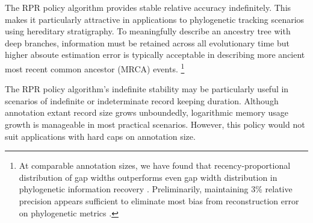 The RPR policy algorithm provides stable relative accuracy indefinitely.
This makes it particularly attractive in applications to phylogenetic tracking scenarios using hereditary stratigraphy.
To meaningfully describe an ancestry tree with deep branches, information must be retained across all evolutionary time but higher absoute estimation error is typically acceptable in describing more ancient most recent common ancestor (MRCA) events.%
\footnote{%
At comparable annotation sizes, we have found that recency-proportional distribution of gap widths outperforms even gap width distribution in phylogenetic information recovery \citep{moreno2022hereditary}.
Preliminarily, maintaining 3\% relative precision appears sufficient to eliminate most bias from reconstruction error on phylogenetic metrics \citep{moreno2023toward}.
}

The RPR policy algorithm's indefinite stability may be particularly useful in scenarios of indefinite or indeterminate record keeping duration.
Although annotation extant record size grows unboundedly, logarithmic memory usage growth is manageable in most practical scenarios.
However, this policy would not suit applications with hard caps on annotation size. %


% 
% 

% 

% 
